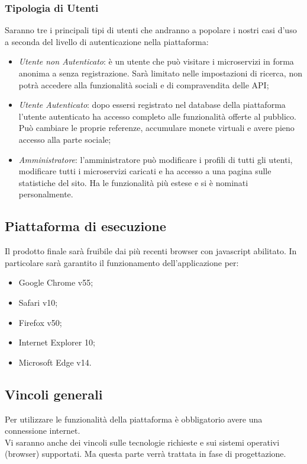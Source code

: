 \documentclass[12pt,a4paper,titlepage]{article}
\begin{document}
	\subsubsection{Tipologia di Utenti}
	Saranno tre i principali tipi di utenti che andranno a popolare i nostri casi d'uso a seconda del livello di autenticazione nella piattaforma:
	\begin{itemize}
		\item \textit{Utente non Autenticato}: è un utente che può visitare i microservizi in forma anonima a senza registrazione. Sarà limitato nelle impostazioni di ricerca, non potrà accedere alla funzionalità sociali e di compravendita delle API;
		\item \textit{Utente Autenticato}: dopo essersi registrato nel database della piattaforma l'utente autenticato ha accesso completo alle funzionalità offerte al pubblico. Può cambiare le proprie referenze, accumulare monete virtuali e avere pieno accesso alla parte sociale;
		\item \textit{Amministratore}: l'amministratore può modificare i profili di tutti gli utenti, modificare tutti i microservizi caricati e ha accesso a una pagina sulle statistiche del sito. Ha le funzionalità più estese e si è nominati personalmente. 
	\end{itemize}
	
	\subsection{Piattaforma di esecuzione}
	Il prodotto finale sarà fruibile dai più recenti browser con javascript abilitato. In particolare sarà garantito il funzionamento dell'applicazione per:
	\begin{itemize}
		\item Google Chrome v55;
		\item Safari v10;
		\item Firefox v50;
		\item Internet Explorer 10;
		\item Microsoft Edge v14.
	\end{itemize}
	
	\subsection{Vincoli generali}
	Per utilizzare le funzionalità della piattaforma è obbligatorio avere una connessione internet.\\
	Vi saranno anche dei vincoli sulle tecnologie richieste e sui sistemi operativi (browser) supportati. Ma questa parte verrà trattata in fase di progettazione.
	\newpage
	
\end{document}
